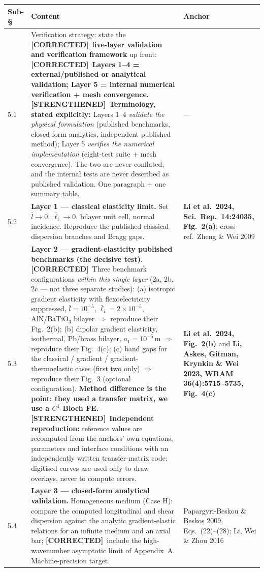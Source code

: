 \documentclass[11pt,a4paper]{article}
\newcommand{\STR}{{\color{strcol}\textbf{[STRENGTHENED]}}}
\newcommand{\COR}{{\color{corcol}\textbf{[CORRECTED]}}}
\begin{document}
\begin{xltabular}{\textwidth}{@{}L{1.5cm} Y L{3.4cm}@{}}
\toprule
Sub-\S & Content & Anchor \\
 & Verification strategy: state the \COR\ \textbf{five-layer validation and verification framework} up front: \COR\ \textbf{Layers 1--4 = external/published or analytical validation; Layer 5 = internal numerical verification + mesh convergence.} \STR\ \textbf{Terminology, stated explicitly:} Layers 1--4 \emph{validate the physical formulation} (published benchmarks, closed-form analytics, independent published method); Layer 5 \emph{verifies the numerical implementation} (eight-test suite + mesh convergence). The two are never conflated, and the internal tests are never described as published validation. One paragraph + one summary table. & --- \\
5.2 & \textbf{Layer 1 --- classical elasticity limit.} Set $\bar l\to0,\ \bar\ell_{\mathrm i}\to0$, bilayer unit cell, normal incidence. Reproduce the published classical dispersion branches and Bragg gaps. & \textbf{Li et al.\ 2024, Sci.\ Rep.\ 14:24035, Fig.~2(a)}; cross-ref.\ Zheng \& Wei 2009 \\
5.3 & \textbf{Layer 2 --- gradient-elasticity published benchmarks (the decisive test).} \COR\ Three benchmark configurations \emph{within this single layer} (2a, 2b, 2c --- not three separate studies):
(a) isotropic gradient elasticity with flexoelectricity suppressed, $\bar l=10^{-5}$, $\bar\ell_{\mathrm i}=2\times10^{-5}$, AlN/BaTiO$_3$ bilayer $\Rightarrow$ reproduce their Fig.~2(b);
(b) dipolar gradient elasticity, isothermal, Pb/brass bilayer, $a_1=10^{-5}$\,m $\Rightarrow$ reproduce their Fig.~4(c);
(c) band gaps for the classical / gradient / gradient-thermoelastic cases (first two only) $\Rightarrow$ reproduce their Fig.~3 (optional configuration).
\textbf{Method difference is the point: they used a transfer matrix, we use a $C^1$ Bloch FE.} \STR\ \textbf{Independent reproduction:} reference values are recomputed from the anchors' own equations, parameters and interface conditions with an independently written transfer-matrix code; digitised curves are used only to draw overlays, never to compute errors. & \textbf{Li et al.\ 2024, Fig.~2(b)} and \textbf{Li, Askes, Gitman, Krynkin \& Wei 2023, WRAM 36(4):5715--5735, Fig.~4(c)} \\
5.4 & \textbf{Layer 3 --- closed-form analytical validation.} Homogeneous medium (Case H): compare the computed longitudinal and shear dispersion against the analytic gradient-elastic relations for an infinite medium and an axial bar; \COR\ include the high-wavenumber asymptotic limit of Appendix~A. Machine-precision target. & Papargyri-Beskou \& Beskos 2009, Eqs.\ (22)--(28); Li, Wei \& Zhou 2016 \\

\end{xltabular}
\end{document}
